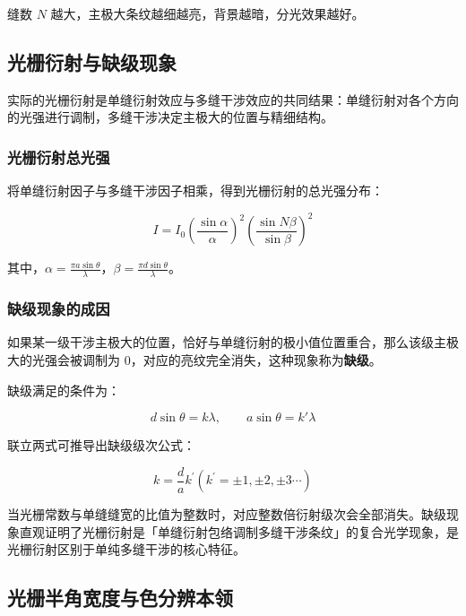 \documentclass[12pt,a4paper]{ctexrep}
\begin{document}
缝数 $N$ 越大，主极大条纹越细越亮，背景越暗，分光效果越好。

\subsection{光栅衍射与缺级现象}

实际的光栅衍射是单缝衍射效应与多缝干涉效应的共同结果：单缝衍射对各个方向的光强进行调制，多缝干涉决定主极大的位置与精细结构。

\subsubsection{光栅衍射总光强}

将单缝衍射因子与多缝干涉因子相乘，得到光栅衍射的总光强分布：

\begin{equation*}
I={I}_{0}{\left( \frac{\sin{\alpha}}{\alpha} \right)}^{2}{\left( \frac{\sin N\beta}{\sin{\beta}} \right)}^{2}
\end{equation*}

其中，$\alpha=\frac{\pi a\sin \theta}{\lambda}$，$\beta=\frac{\pi d\sin \theta}{\lambda}$。

\subsubsection{缺级现象的成因}

如果某一级干涉主极大的位置，恰好与单缝衍射的极小值位置重合，那么该级主极大的光强会被调制为 0，对应的亮纹完全消失，这种现象称为\textbf{缺级}。

缺级满足的条件为：

\begin{equation*}
d\sin\theta=k\lambda,\qquad a\sin\theta=k'\lambda
\end{equation*}

联立两式可推导出缺级级次公式：

\begin{equation*}
k=\frac{d}{a}{k}^{'}({k}^{'}=\pm1,\pm2,\pm3\cdots)
\end{equation*}

当光栅常数与单缝缝宽的比值为整数时，对应整数倍衍射级次会全部消失。缺级现象直观证明了光栅衍射是「单缝衍射包络调制多缝干涉条纹」的复合光学现象，是光栅衍射区别于单纯多缝干涉的核心特征。

\subsection{光栅半角宽度与色分辨本领}
\end{document}
